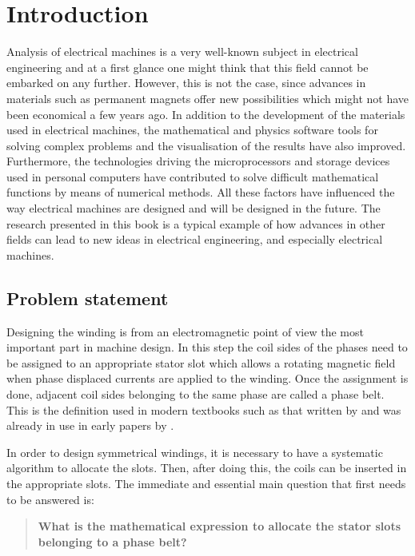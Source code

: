 \chapter{Introduction}
Analysis of electrical machines is a very well-known subject in electrical engineering and at a first glance one might think that this field cannot be embarked on any further. However, this is not the case, since advances in materials such as permanent magnets offer new possibilities which might not have been economical a few years ago. In addition to the development of the materials used in electrical machines, the mathematical and physics software tools for solving complex problems and the visualisation of the results have also improved. Furthermore, the technologies driving the microprocessors and storage devices used in personal computers have contributed to solve difficult mathematical functions by means of numerical methods. All these factors have influenced the way electrical machines are designed and will be designed in the future. The research presented in this book is a typical example of how advances in other fields can lead to new ideas in electrical engineering, and especially electrical machines. 

\section{Problem statement}
\label{sec:problem_statement}
Designing the winding is from an electromagnetic point of view the most important part in machine design. In this step the coil sides of the phases need to be assigned to an appropriate stator slot which allows a rotating magnetic field when phase displaced currents are applied to the winding. Once the assignment is done, adjacent coil sides belonging to the same phase are called a phase belt. This is the definition used in modern textbooks such as that written by \cite{REF-00330} and was already in use in early papers by \cite{REF-00835}.

In order to design symmetrical windings, it is necessary to have a systematic algorithm to allocate the slots. Then, after doing this, the coils can be inserted in the appropriate slots. The immediate and essential main question that first needs to be answered is: 
\begin{quote}
\textbf{What is the mathematical expression to allocate the stator slots belonging to a phase belt?} 
\end{quote}


